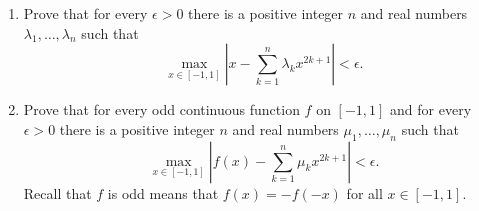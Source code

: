 \documentclass{article}
\begin{document}
	\setlength{\parindent}{0pt}
	\begin{enumerate}[label=\alph*)]
		\item  Prove that for every $\epsilon>0$ there is a positive integer $n$ and real numbers $\lambda_1,\dots,\lambda_n$ such that
		$$\max_{x\in [-1,1]}\left\lvert x-\sum_{k=1}^{n}\lambda_k x^{2k+1}\right\rvert<\epsilon.$$
		\item  Prove that for every odd continuous function $f$ on $[-1,1]$ and for every $\epsilon>0$ there is a positive integer $n$ and real numbers $\mu_1,\dots,\mu_n$ such that
		$$\max_{x\in [-1,1]}\left\lvert f(x)-\sum_{k=1}^{n}\mu_k x^{2k+1}\right\rvert<\epsilon.$$
		Recall that $f$ is odd means that $f(x)=-f(-x)$ for all $x\in [-1,1]$.
	\end{enumerate}
\end{document}
